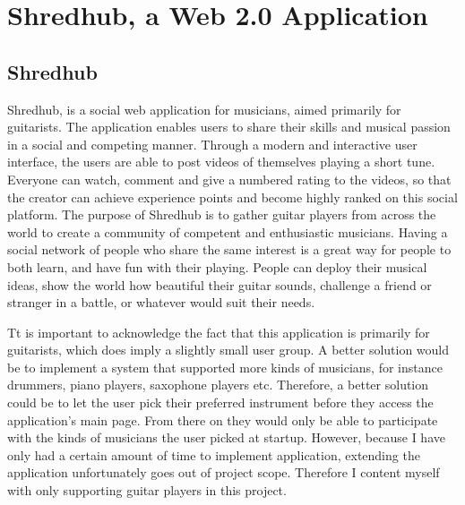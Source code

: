 \chapter{Shredhub, a Web 2.0 Application}
	
\section {Shredhub}
Shredhub, is a social web application for musicians, aimed primarily for guitarists. The application enables users to share their skills and musical passion in a social and competing manner. Through a modern and interactive user interface, the users are able to post videos of themselves playing a short tune. Everyone can watch, comment and give a numbered rating to the videos, so that the creator can achieve experience points and become highly ranked on this social platform. The purpose of Shredhub is to gather guitar players from across the world to create a community of competent and enthusiastic musicians. Having a social network of people who share the same interest is a great way for people to both learn, and have fun with their playing. People can deploy their musical ideas, show the world how beautiful their guitar sounds, challenge a friend or stranger in a battle, or whatever would suit their needs. 
		
Tt is important to acknowledge the fact that this application is primarily for guitarists, which does imply a slightly small user group. A better solution would be to implement a system that supported more kinds of musicians, for instance drummers, piano players, saxophone players etc. Therefore, a better solution could be to let the user pick their preferred instrument before they access the application's main page. From there on they would only be able to participate with the kinds of musicians the user picked at startup. However, because I have only had a certain amount of time to implement application, extending the application unfortunately goes out of project scope. Therefore I content myself with only supporting guitar players in this project. 
		

